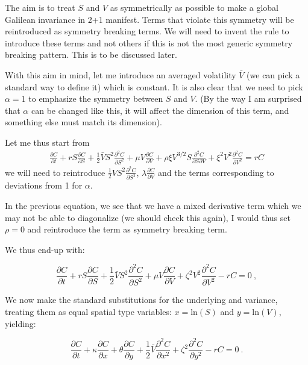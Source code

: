 \documentclass[english,12pt]{article}
\begin{document}
The aim is to treat $S$ and $V$ as symmetrically as possible to make a global Galilean invariance in 2+1 manifest. Terms that violate this symmetry will be reintroduced as symmetry breaking terms. We will need to invent the rule to introduce these terms and not others if this is not the most generic symmetry breaking pattern. This is to be discussed later.

With this aim in mind, let me introduce an averaged volatility $\bar V$ (we can pick a standard way to define it) which is constant.  It is also clear that we need to pick $\alpha=1$  to emphasize the symmetry between $S$ and $V$. (By the way I am surprised that $\alpha$ can be changed like this, it will affect the dimension of this term, and something else must match its dimension).

Let me thus start from 
\begin{eqnarray}
\frac{\partial C}{\partial t}+ r S \frac{\partial C}{\partial S} + \frac{1}{2} \bar V S^2 \frac{\partial^2 C}{\partial S^2} +\mu V \frac{\partial C}{\partial V} +\rho \xi V^{3/2} S \frac{\partial^2 C}{\partial S \partial V} +\xi^2 V^{2}  \frac{\partial^2 C}{\partial V^2}= r C
\end{eqnarray}
we will need to reintroduce $\frac{1}{2} V S^2 \frac{\partial^2 C}{\partial S^2}$,  $\lambda \frac{\partial C}{\partial V} $ and the terms corresponding to deviations from 1 for $\alpha$.

In the previous equation, we see that we have a mixed derivative term which we may not be able to diagonalize (we should check this again), I would thus set $\rho=0$ and reintroduce the term as symmetry breaking term. 

We thus end-up with:

\begin{equation}
\frac{\partial C}{\partial t} + rS\frac{\partial C}{\partial S} + \frac{1}{2}\bar{V}S^{2}\frac{\partial^2 C}{\partial S^2} + \mu V \frac{\partial C}{\partial V} + \zeta^2 V^2 \frac{\partial^2 C}{\partial V^2} - rC = 0~,
\end{equation}


We now make the standard substitutions for the underlying and variance, treating them as equal spatial type variables: $x = \text{ln}(S)$ and $y = \text{ln}(V)$, yielding:

\begin{equation}
\frac{\partial C}{\partial t} + \kappa \frac{\partial C}{\partial x} + \theta \frac{\partial C}{\partial y} + \frac{1}{2}\bar{V}\frac{\partial^2 C}{\partial x^2} + \zeta^2 \frac{\partial^2 C}{\partial y^2} - rC = 0~.
\end{equation}
\end{document}
